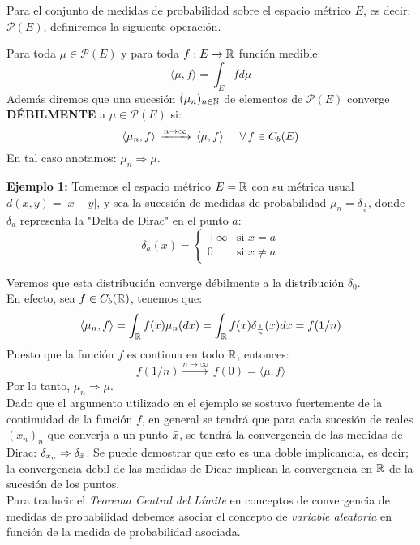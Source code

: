 \hspace{3.5mm}Para el conjunto de medidas de probabilidad sobre el espacio métrico $E$, es decir; $\mathcal{P}(E)$, definiremos la siguiente operación.
\begin{definicion}
Para toda $\mu \in \mathcal{P}(E)$ y para toda $f: E\rightarrow \mathbb R$ función medible:
\begin{equation}
    \langle \mu , f\rangle = \int_{E} f d\mu
\end{equation}
Además diremos que una sucesión $(\mu_n)_{n\in\mathbb N}$ de elementos de $\mathcal{P}(E)$ converge \textbf{DÉBILMENTE} a $\mu\in \mathcal{P}(E)$ si:
\[\langle \mu_n ,f\rangle\, \xrightarrow{n\rightarrow\infty}\, \langle \mu,f\rangle \hspace{0.5cm}\forall\,f\in C_b(E)\]
En tal caso anotamos: $\mu_n \Rightarrow \mu$.
\end{definicion}
\textbf{Ejemplo 1:} Tomemos el espacio métrico $E=\mathbb R$ con su métrica usual $d(x,y) = |x-y|$, y sea la sucesión de medidas de probabilidad $\mu_n = \delta_{\frac{1}{n}}$, donde $\delta_a$ representa la "Delta de Dirac" en el punto $a$:
    \[\delta_a(x) = \begin{cases} 
            +\infty & \text{si }x=a   \\ 
            0 & \text{si }x\neq a \end{cases}\]
    
    Veremos que esta distribución converge débilmente a la distribución $\delta_0$.\\
    En efecto, sea $f \in C_b(\mathbb R)$, tenemos que:
    \[\langle \mu_n ,f\rangle = \int_\mathbb R f(x) \mu_n (dx) = \int_\mathbb R f(x) \delta_{\frac{1}{n}}(x) dx = f(1/n)\]
    Puesto que la función $f$ es continua en todo $\mathbb R$, entonces:
    \[f(1/n) \xrightarrow{n\rightarrow\infty}\,f(0) = \langle \mu,f\rangle \]
    Por lo tanto, $\mu_n \Rightarrow \mu$.
\\

Dado que el argumento utilizado en el ejemplo se sostuvo fuertemente de la continuidad de la función $f$, en general se tendrá que para cada sucesión de reales $(x_n)_n$ que converja a un punto $\Bar{x}$, se tendrá la convergencia de las medidas de Dirac: $\delta_{x_n}\Rightarrow \delta_{\Bar{x}}$. Se puede demostrar que esto es una doble implicancia, es decir; la convergencia debil de las medidas de Dicar implican la convergencia en $\mathbb R$ de la sucesión de los puntos.\\

Para traducir el \textit{Teorema Central del Límite} en conceptos de convergencia de medidas de probabilidad debemos asociar el concepto de \textit{variable aleatoria} en función de la medida de probabilidad asociada.\\

